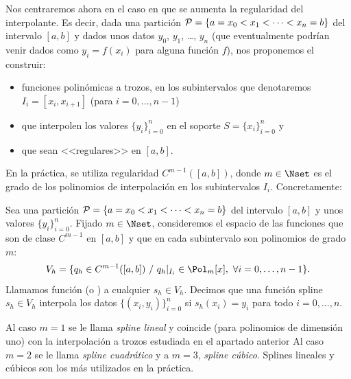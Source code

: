 Nos centraremos ahora en
el caso en que se aumenta la regularidad del interpolante.
Es decir, dada una partición
${\cal P}= \{a = x_0 <x_1 < \cdots <x_n=b\}$
del intervalo $[a,b]$ y dados unos datos $y_0$, $y_1$, \dots, $y_n$
(que eventualmente podrían venir dados como $y_i=f(x_i)$ para alguna
función $f$), nos proponemos el construir:
\begin{itemize}
\item  funciones polinómicas a trozos, en los subintervalos que
  denotaremos $I_i=[x_{i},x_{i+1}]$ (para $ i=0,\dots,n-1$)
\item que interpolen los valores $\{y_i\}_{i=0}^n$ en el soporte
  $S=\{x_i\}_{i=0}^n$ y
\item que sean <<regulares>> en $[a,b]$.
\end{itemize}
En la práctica, se utiliza regularidad $C^{m-1}([a,b])$, donde
$m\in\Nset$ es el grado de los polinomios de
interpolación en los subintervalos $I_i$. Concretamente:

\begin{definition}
  \label{def:funcion-spline}
  Sea una partición ${\cal P}= \{a = x_0 <x_1 < \cdots <x_n=b\}$ del
  intervalo $[a,b]$ y unos valores $\{y_i\}_{i=0}^n$. Fijado
  $m\in\Nset$, consideremos el espacio de las funciones que son
  de clase $C^{m-1}$ en $[a,b]$ y que en cada subintervalo son
  polinomios de grado $m$:
  \begin{equation*}
    V_h = \{q_h \in C^{m-1}([a,b])\ / \ q_h|_{I_i}\in  \Pol_m[x],\ \forall i=0,\dots,n-1\}.
  \end{equation*}
  Llamamos función  (o ) a
  cualquier $s_h\in V_h$. Decimos que una función spline $s_h\in V_h$
  interpola los datos $\{(x_i,y_i)\}_{i=0}^n$ si $s_h(x_i)=y_i$ para
  todo $i=0,\dots,n$.
\end{definition}

Al caso $m=1$ se le llama \textit{spline lineal} y coincide (para
polinomios de dimensión uno) con la interpolación a trozos estudiada
en el apartado anterior Al caso $m=2$ se le llama \textit{spline
  cuadrático} y a $m=3$, \textit{spline cúbico}. Splines lineales y
cúbicos son los más utilizados en la práctica.

